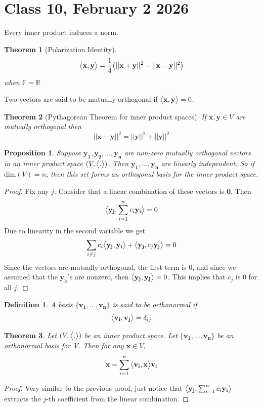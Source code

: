 \documentclass{article}
\newtheorem{theorem}{Theorem}
\newtheorem{definition}{Definition}
\newtheorem{proposition}{Proposition}
\begin{document}
\section*{Class 10, February 2 2026}
Every inner  product induces a norm. 
\begin{theorem}[Polarization Identity]
    $$\big{<}\mathbf{x},\mathbf{y}\big{>}=\frac{1}{4}\big{(}||\mathbf{x}+\mathbf{y}||^{2}-||\mathbf{x}-\mathbf{y}||^2\big{)}$$
    when $\mathbb{F}=\mathbb{R}$
\end{theorem}
Two vectors are said to be mutually orthogonal if $\big{<}\mathbf{x},\mathbf{y}\big{>}=0$. 
\begin{theorem}[Pythagorean Theorem for inner product spaces]
If $\mathbf{x},\mathbf{y}\in V$ are mutually orthogonal then 
$$||\mathbf{x}+\mathbf{y}||^2=||\mathbf{y}||^2 +||\mathbf{y}||^2$$
\end{theorem}
\begin{proposition}
    Suppose $\mathbf{y_1},\mathbf{y_2},\dots,\mathbf{y_n}$ are non-zero mutually orthogonal vectors in an inner product space $(V,\big{<}.\big{>})$. Then $\mathbf{y_1},\dots,\mathbf{y_n}$ are linearly independent. So if $\text{dim}(V)=n$, then this set forms an orthogonal basis for the inner product space.
\end{proposition}
\begin{proof}
    Fix any $j$. Consider that a linear combination of these vectors is $\mathbf{0}$. Then 
    $$\big{<}\mathbf{y_j},\sum_{i=1}^n c_i\mathbf{y_i}\big{>}=0$$
    Due to linearity in the second variable we get
    $$\sum_{i\neq j}c_i\big{<}\mathbf{y_j},\mathbf{y_i}\big{>}+\big{<}\mathbf{y_j},c_j\mathbf{y_j}\big{>}=0$$
    Since the vectors are mutually orthogonal, the first term is 0, and since we assumed that the $\mathbf{y_k}$'s are nonzero, then $\big{<}\mathbf{y_j},\mathbf{y_j}\big{>}=0$. This implies that $c_j$ is $0$ for all $j$.
\end{proof}
\begin{definition}
    A basis $\{\mathbf{v_1},\dots,\mathbf{v_n}\}$ is said to be orthonormal if 
    $$\big{<}\mathbf{v_i},\mathbf{v_j}\big{>}=\delta_{ij}$$
\end{definition}
\begin{theorem}
    Let $(V,\big{<}.\big{>})$ be an inner product space. Let $\{\mathbf{v_1},\dots,\mathbf{v_n}\}$ be an orthonormal basis for V. Then for any $\mathbf{x}\in V$, 
    $$\mathbf{x}=\sum_{i=1}^{n}\big{<}\mathbf{v_i},\mathbf{x}\big{>}\mathbf{v_i}$$
\end{theorem}
\begin{proof}
        Very similar to the previous proof, just notice that $\big{<}\mathbf{y_j},\sum_{i=1}^{n}c_i\mathbf{y_i}\big{>}$ extracts the $j$-th coefficient from the linear combination.
\end{proof}
\end{document}
